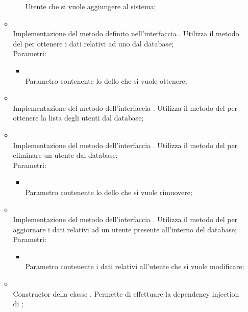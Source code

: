 \begin{itemize}
\begin{itemize}
\begin{itemize}
			Utente che si vuole aggiungere al sistema;
		\end{itemize}
		\item[]  \\		Implementazione del metodo definito nell'interfaccia . Utilizza il metodo  del  per ottenere i dati relativi ad uno  dal database;\\
		Parametri:
		\begin{itemize}
			\item {} \\
			Parametro contenente lo  dello  che si vuole ottenere;
		\end{itemize}
		\item[]  \\		Implementazione del metodo dell'interfaccia . Utilizza il metodo  del  per ottenere la lista degli utenti dal database;\\
		\item[]  \\		Implementazione del metodo dell'interfaccia . Utilizza il metodo  del  per eliminare un utente dal database;\\
		Parametri:
		\begin{itemize}
			\item {} \\
			Parametro contenente lo  dello  che si vuole rimuovere;
		\end{itemize}
		\item[]  \\		Implementazione del metodo dell'interfaccia . Utilizza il metodo  del  per aggiornare i dati relativi ad un utente presente all'interno del database;\\
		Parametri:
		\begin{itemize}
			\item {} \\
			Parametro contenente i dati relativi all'utente che si vuole modificare;
		\end{itemize}
		\item[]  \\		Constructor della classe . Permette di effettuare la dependency injection di ;\\

\end{itemize}
\end{itemize}

